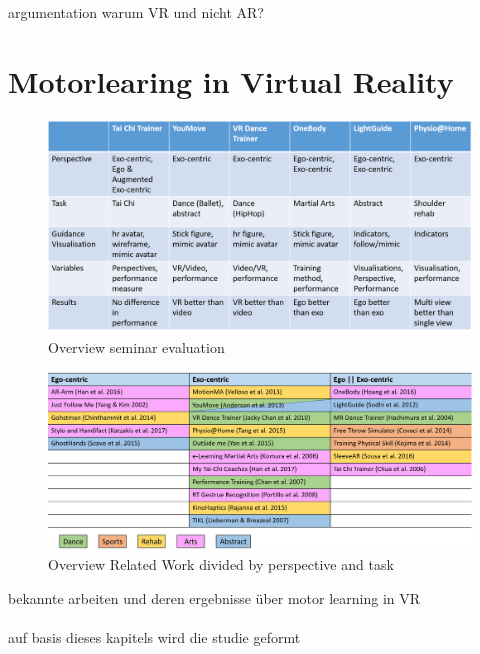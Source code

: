argumentation warum VR und nicht AR?
\section{Motorlearing in Virtual Reality}
\begin{figure}[htb]
	\centering
	\includegraphics[width=\textwidth]{figures/detail_paper_overview.png}
	\caption[Overview seminar evaluation]{Overview seminar evaluation}
	\label{fig:rw_overview_detail}
\end{figure}

\begin{figure}[htb]
	\centering
	\includegraphics[width=\textwidth]{figures/rw_overview.png}
	\caption[Overview seminar evaluation]{Overview Related Work divided by perspective and task}
	\label{fig:rw_overview}
\end{figure}
bekannte arbeiten und deren ergebnisse über motor learning in VR\\
\\
auf basis dieses kapitels wird die studie geformt

